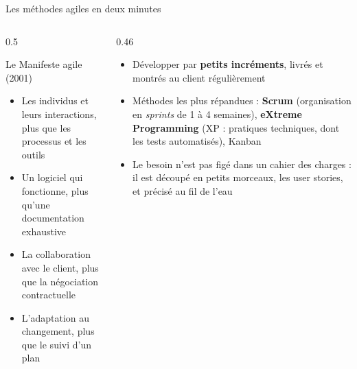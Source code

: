 \documentclass[aspectratio=169,10pt]{beamer}
\begin{document}
\begin{frame}{Les méthodes agiles en deux minutes}
  \begin{columns}[T]
    \begin{column}{0.5\textwidth}
      \begin{block}{Le Manifeste agile (2001)}
        \small
        \begin{itemize}
          \item Les individus et leurs interactions, plus que les processus et les outils
          \item Un logiciel qui fonctionne, plus qu'une documentation exhaustive
          \item La collaboration avec le client, plus que la négociation contractuelle
          \item L'adaptation au changement, plus que le suivi d'un plan
        \end{itemize}
      \end{block}
    \end{column}
    \begin{column}{0.46\textwidth}
      \begin{itemize}
        \item Développer par \textbf{petits incréments}, livrés et montrés au client régulièrement
        \item Méthodes les plus répandues : \textbf{Scrum} (organisation en \textit{sprints} de 1 à 4 semaines), \textbf{eXtreme Programming} (XP : pratiques techniques, dont les tests automatisés), Kanban
        \item Le besoin n'est pas figé dans un cahier des charges : il est découpé en petits morceaux, \alert{les user stories}, et précisé au fil de l'eau
      \end{itemize}
    \end{column}
  \end{columns}
\end{frame}
\end{document}
